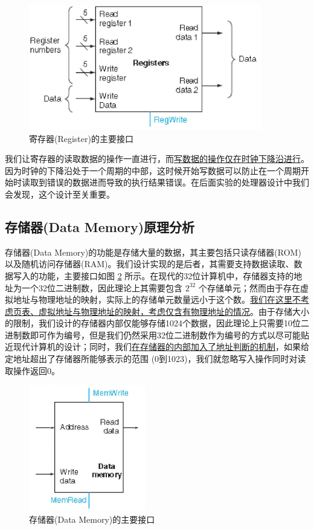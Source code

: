 \documentclass{cumcm}
\numberwithin{equation}{section}
\numberwithin{equation}{subsection}
\begin{document}
\begin{figure}[htbp]
    \centering
    \includegraphics[width=4in]{registers.png}
    \caption{寄存器(Register)的主要接口}
    \label{fig1}
\end{figure}

我们让寄存器的读取数据的操作一直进行，而\underline{写数据的操作仅在时钟下降沿进行}。因为时钟的下降沿处于一个周期的中部，这时候开始写数据可以防止在一个周期开始时读取到错误的数据进而导致的执行结果错误。在后面实验的处理器设计中我们会发现，这个设计至关重要。



\subsection{存储器(Data Memory)原理分析}\label{section2.2}

存储器(Data Memory)的功能是存储大量的数据，其主要包括只读存储器(ROM)以及随机访问存储器(RAM)。我们设计实现的是后者，其需要支持数据读取、数据写入的功能，主要接口如图 \ref{fig2} 所示。在现代的32位计算机中，存储器支持的地址为一个32位二进制数，因此理论上其需要包含 $2^{32}$ 个存储单元；然而由于存在虚拟地址与物理地址的映射，实际上的存储单元数量远小于这个数。\underline{我们在这里不考虑页表、虚拟地址与物理地址的映射，考虑仅含有物理地址的情况}。由于存储大小的限制，我们设计的存储器内部仅能够存储1024个数据，因此理论上只需要10位二进制数即可作为编号，但是我们仍然采用32位二进制数作为编号的方式以尽可能贴近现代计算机的设计；同时，我们\underline{在存储器的内部加入了地址判断的机制}，如果给定地址超出了存储器所能够表示的范围 (0到1023)，我们就忽略写入操作同时对读取操作返回0。

\begin{figure}[htbp]
    \centering
    \includegraphics[width=2in]{memory.png}
    \caption{存储器(Data Memory)的主要接口}
    \label{fig2}
\end{figure}
\end{document}

